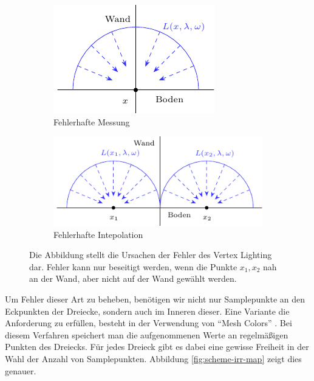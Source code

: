 	\begin{figure}[h]
		\begin{subfigure}[t]{0.4\textwidth}
			\center
			\includegraphics{gg_fig/vertex_lighting-error_1.pdf}
			\caption{Fehlerhafte Messung}
		\end{subfigure}
		\begin{subfigure}[t]{0.6\textwidth}
			\center
			\includegraphics{gg_fig/vertex_lighting-error_2.pdf}
			\caption{Fehlerhafte Intepolation}
		\end{subfigure}
		\caption{Die Abbildung stellt die Ursachen der Fehler des Vertex Lighting dar. Fehler kann nur beseitigt werden, wenn die Punkte $x_1,x_2$ nah an der Wand, aber nicht auf der Wand gewählt werden.}
		\label{fig:vertex-lighting-error}
	\end{figure}

	Um Fehler dieser Art zu beheben, benötigen wir nicht nur Samplepunkte an den Eckpunkten der Dreiecke, sondern auch im Inneren dieser.
	Eine Variante die Anforderung zu erfüllen, besteht in der Verwendung von \enquote{Mesh Colors} \cite{mesh-colors}.
	Bei diesem Verfahren speichert man die aufgenommenen Werte an regelmäßigen Punkten des Dreiecks.
	Für jedes Dreieck gibt es dabei eine gewisse Freiheit in der Wahl der Anzahl von Samplepunkten.
	Abbildung \ref{fig:scheme-irr-map} zeigt dies genauer.

